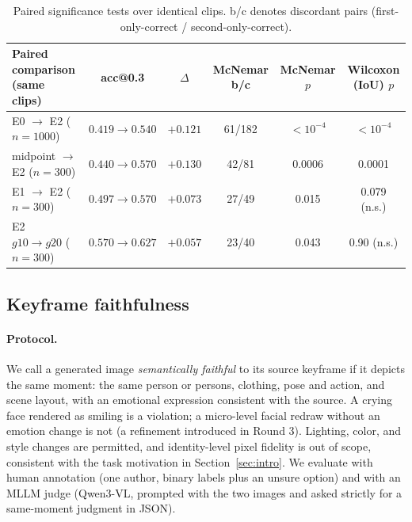 \begin{table}[t]
\centering
\small
\begin{tabular}{lccccc}
\toprule
Paired comparison (same clips) & acc@0.3 & $\Delta$ & McNemar b/c & McNemar $p$ & Wilcoxon (IoU) $p$ \\
\midrule
E0 $\rightarrow$ E2 ($n=1000$) & $0.419 \rightarrow 0.540$ & $+0.121$ & 61/182 & $<10^{-4}$ & $<10^{-4}$ \\
midpoint $\rightarrow$ E2 ($n=300$) & $0.440 \rightarrow 0.570$ & $+0.130$ & 42/81 & 0.0006 & 0.0001 \\
E1 $\rightarrow$ E2 ($n=300$) & $0.497 \rightarrow 0.570$ & $+0.073$ & 27/49 & 0.015 & 0.079 (n.s.) \\
E2 $g10 \rightarrow g20$ ($n=300$) & $0.570 \rightarrow 0.627$ & $+0.057$ & 23/40 & 0.043 & 0.90 (n.s.) \\
\bottomrule
\end{tabular}
\caption{Paired significance tests over identical clips. b/c denotes discordant pairs (first-only-correct / second-only-correct).}
\label{tab:sig}
\end{table}

\subsection{Keyframe faithfulness}\label{sec:exp-faith}

\paragraph{Protocol.}
We call a generated image \emph{semantically faithful} to its source keyframe if it depicts the same moment: the same person or persons, clothing, pose and action, and scene layout, with an emotional expression consistent with the source. A crying face rendered as smiling is a violation; a micro-level facial redraw without an emotion change is not (a refinement introduced in Round 3). Lighting, color, and style changes are permitted, and identity-level pixel fidelity is out of scope, consistent with the task motivation in Section~\ref{sec:intro}. We evaluate with human annotation (one author, binary labels plus an unsure option) and with an MLLM judge (Qwen3-VL, prompted with the two images and asked strictly for a same-moment judgment in JSON).

